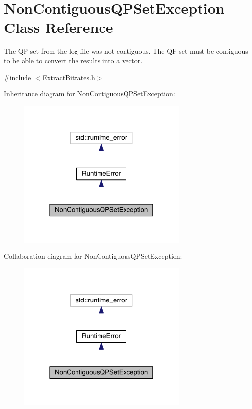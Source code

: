 \hypertarget{class_non_contiguous_q_p_set_exception}{}\section{Non\+Contiguous\+Q\+P\+Set\+Exception Class Reference}
\label{class_non_contiguous_q_p_set_exception}


The QP set from the log file was not contiguous. The QP set must be contiguous to be able to convert the results into a vector.  




{\ttfamily \#include $<$Extract\+Bitrates.\+h$>$}



Inheritance diagram for Non\+Contiguous\+Q\+P\+Set\+Exception\+:
\nopagebreak
\begin{figure}[H]
\begin{center}
\leavevmode
\includegraphics[width=238pt]{dd/d0b/class_non_contiguous_q_p_set_exception__inherit__graph}
\end{center}
\end{figure}


Collaboration diagram for Non\+Contiguous\+Q\+P\+Set\+Exception\+:
\nopagebreak
\begin{figure}[H]
\begin{center}
\leavevmode
\includegraphics[width=238pt]{df/dca/class_non_contiguous_q_p_set_exception__coll__graph}
\end{center}
\end{figure}
